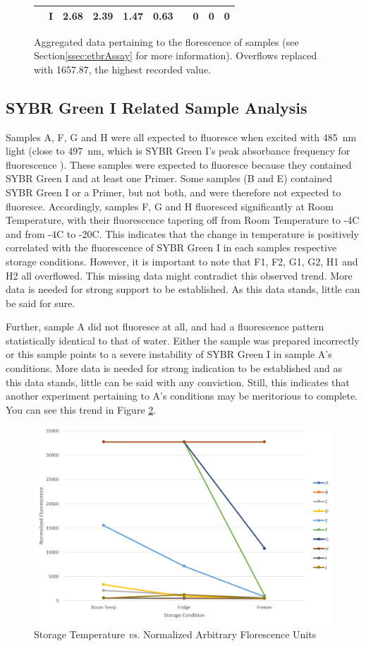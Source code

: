 \documentclass[a4paper,xcolor=table]{article}
\newcommand{\C}{\degree C}
\begin{document}
\begin{figure}[ht]
\begin{tabular}{|l|l|l|l|l|l|l|l|l|l|}
\multirow{-5}{*}{\cellcolor[HTML]{FE0000}}   & I         & 2.68    & 2.39    & 1.47                        & 0.63                                                        &          & 0      & 0       & 0  \\ \hline
\end{tabular}
\caption[Aggregated data pertaining to the florescence of samples.]{Aggregated data pertaining to the florescence of samples (see Section\ref{ssec:etbrAssay} for more information). Overflows replaced with 1657.87, the highest recorded value.}
\label{my-label}
\end{figure}

\subsection{SYBR Green I Related Sample Analysis}
Samples A, F, G and H were all expected to fluoresce when excited with \SI{485}{\nano\m} light (close to \SI{497}{\nano\m}, which is SYBR Green I's peak absorbance frequency for fluorescence \cite{sybrGreenI}).  These samples were expected to fluoresce because they contained SYBR Green I and at least one Primer. Some samples (B and E) contained SYBR Green I or a Primer, but not both, and were therefore not expected to fluoresce. Accordingly, samples F, G and H fluoresced significantly at Room Temperature, with their fluorescence tapering off from Room Temperature to -4\C{} and from -4\C{} to -20\C{}. This indicates that the change in temperature is positively correlated with the fluorescence of SYBR Green I in each samples respective storage conditions. However, it is important to note that F1, F2, G1, G2, H1 and H2 all overflowed. This missing data might contradict this observed trend. More data is needed for strong support to be established. As this data stands, little can be said for sure. 

Further, sample A did not fluoresce at all, and had a fluorescence pattern statistically identical to that of water. Either the sample was prepared incorrectly or this sample points to a severe instability of SYBR Green I in sample A's conditions. More data is needed for strong indication to be established and as this data stands, little can be said with any conviction. Still, this indicates that another experiment pertaining to A's conditions may be meritorious to complete. You can see this trend in Figure \ref{sybrTrend}.

\begin{figure}[ht]
\centering
\includegraphics[width=.6\textwidth]{sybrTrend.png}
\caption{Storage Temperature \textit{vs.} Normalized Arbitrary Florescence Units}
\label{sybrTrend}
\end{figure}
\end{document}
